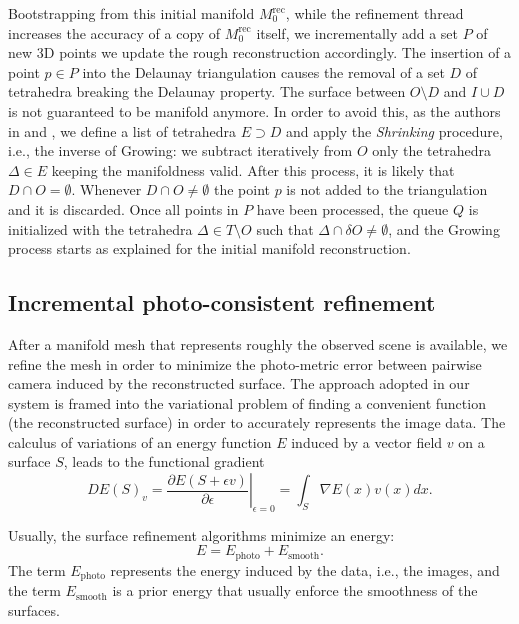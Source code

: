 Bootstrapping from this initial manifold $\mathit{M}_{0}^{\text{rec}}$, while the refinement thread increases the accuracy of a copy of $\mathit{M}_{0}^{\text{rec}}$ itself, we incrementally add a  set $P$ of new 3D points we update the rough reconstruction accordingly.
The insertion of a point $p\in P$  into the Delaunay triangulation causes the removal of a set $D$ of tetrahedra breaking the Delaunay property. The surface between $O \setminus D$ and $I \cup D$ is not guaranteed to be manifold anymore. 
In order to avoid this, as the authors in \cite{litvinov_lhuillier_13} and \cite{romanoni15a}, we define a list of tetrahedra $E \supset D$ and apply the \emph{Shrinking} procedure, i.e., the inverse of Growing:  we subtract iteratively from $O$ only the tetrahedra  $\Delta \in E$ keeping the manifoldness valid.
After this process, it is likely that $D \cap O = \emptyset$.
Whenever $D \cap O \neq \emptyset$ the point $p$ is not added to the triangulation and it is discarded.
Once all points in $P$ have been processed, the queue $Q$ is initialized with the tetrahedra $\Delta \in T \setminus O$ such that  $\Delta \cap \delta O \neq \emptyset$, and the Growing process starts as explained for the initial manifold reconstruction.



\subsection{Incremental photo-consistent refinement}
\label{sec:Incremental_photoconsistent}
After a manifold mesh that represents roughly the observed scene is available, we refine the mesh in order to minimize the photo-metric error between pairwise camera induced by the reconstructed surface. 
The approach adopted in our system is framed into the variational problem of finding a convenient function (the reconstructed surface) in order to  accurately represents the image data.
The calculus of variations of an energy function $E$ induced by a vector field $v$ on a surface $\mathit{S}$, leads to the functional gradient
\begin{equation}
\label{eq::calculus}
 DE(\mathit{S})_v = \left.\frac{\partial E(\mathit{S} + \epsilon v)}{\partial \epsilon} \right|_{\epsilon=0} = \int_{\mathit{S}} \nabla E(x)v(x) dx.
\end{equation}

Usually, the surface refinement algorithms minimize an energy:
\begin{equation}
E = E_{\textrm{photo}} + E_{\textrm{smooth}} .
\end{equation}
The term $E_{\textrm{photo}}$ represents the energy induced by the data, i.e., the images, and the term $E_{\textrm{smooth}}$ is a prior energy that usually enforce the smoothness of the surfaces. 


